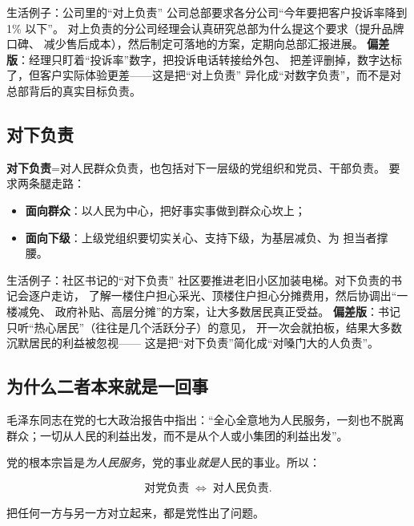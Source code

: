 \documentclass[11pt,a4paper]{ctexart}
\begin{document}
\begin{exampleblock}{生活例子：公司里的``对上负责''}
公司总部要求各分公司``今年要把客户投诉率降到 1\% 以下''。
对上负责的分公司经理会认真研究总部为什么提这个要求（提升品牌口碑、
减少售后成本），然后制定可落地的方案，定期向总部汇报进展。
\textbf{偏差版}：经理只盯着``投诉率''数字，把投诉电话转接给外包、
把差评删掉，数字达标了，但客户实际体验更差——这是把``对上负责''
异化成``对数字负责''，而不是对总部背后的真实目标负责。
\end{exampleblock}

\subsection*{对下负责}

\textbf{对下负责}=对人民群众负责，也包括对下一层级的党组织和党员、干部负责。
要求两条腿走路：

\begin{itemize}
  \item \textbf{面向群众}：以人民为中心，把好事实事做到群众心坎上；
  \item \textbf{面向下级}：上级党组织要切实关心、支持下级，为基层减负、为
        担当者撑腰。
\end{itemize}

\begin{exampleblock}{生活例子：社区书记的``对下负责''}
社区要推进老旧小区加装电梯。对下负责的书记会逐户走访，
了解一楼住户担心采光、顶楼住户担心分摊费用，然后协调出``一楼减免、
政府补贴、高层分摊''的方案，让大多数居民真正受益。
\textbf{偏差版}：书记只听``热心居民''（往往是几个活跃分子）的意见，
开一次会就拍板，结果大多数沉默居民的利益被忽视——
这是把``对下负责''简化成``对嗓门大的人负责''。
\end{exampleblock}

\subsection*{为什么二者本来就是一回事}

\begin{quoteblock}
毛泽东同志在党的七大政治报告中指出：``全心全意地为人民服务，一刻也不脱离
群众；一切从人民的利益出发，而不是从个人或小集团的利益出发''。
\end{quoteblock}

党的根本宗旨是\emph{为人民服务}，党的事业\emph{就是}人民的事业。所以：

\[
\text{对党负责} \;\Longleftrightarrow\; \text{对人民负责}.
\]

把任何一方与另一方对立起来，都是党性出了问题。
\end{document}
